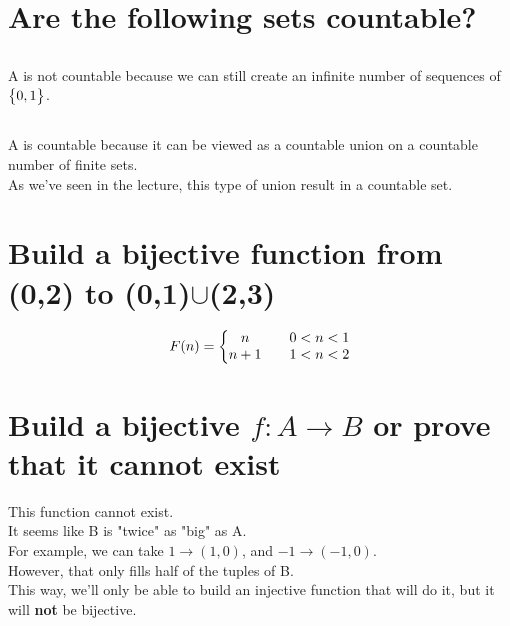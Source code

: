\documentclass[a4paper, 12pt]{article}
\newcommand{\sub}[1]{\subsection{\underline{#1}}}
\newcommand{\eq}[1]{\begin{align*}#1\end{align*}}
\newcommand{\set}[1]{\big{\{} #1 \big{\}}}
\begin{document}
\section{Are the following sets countable?}
\sub{}
A is not countable because we can still create an infinite number of sequences of $\set{0,1}$.
\sub{}
A is countable because it can be viewed as a countable union on a countable number of finite sets.\\
As we've seen in the lecture, this type of union result in a countable set.

\section{Build a bijective function from (0,2) to (0,1)$\cup$(2,3)}
\eq{
    F(n)=\bigg{\{
        \begin{matrix}
            n && 0<n<1\\
            n+1 && 1<n<2\\
        \end{matrix}
    }
}
\pagebreak

\section{Build a bijective $f: A\longrightarrow{B}$ or prove that it cannot exist}
This function cannot exist.\\
It seems like B is "twice" as "big" as A.\\
For example, we can take $1\longrightarrow(1,0)$, and $-1\longrightarrow(-1,0)$.\\
However, that only fills half of the tuples of B.\\
This way, we'll only be able to build an injective function that will do it, but it will \textbf{not} be bijective.
\end{document}
